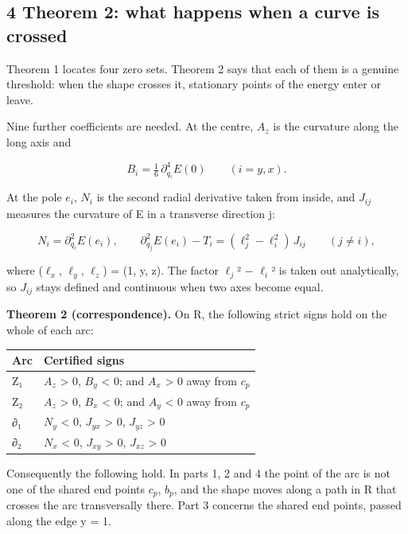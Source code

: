 \documentclass[
  11pt,
]{article}
\begin{document}
\subsection{4 Theorem 2: what happens when a curve is crossed}

Theorem 1 locates four zero sets. Theorem 2 says that each of them is a
genuine threshold: when the shape crosses it, stationary points of the
energy enter or leave.

Nine further coefficients are needed. At the centre, \(A_{z}\) is the
curvature along the long axis and

\[
B_i=\tfrac16\,\partial_{q_i}^4E(0)\qquad(i=y,x).
\]

At the pole \(e_{i}\), \(N_{i}\) is the second radial derivative taken
from inside, and \(J_{ij}\) measures the curvature of E in a transverse
direction j:

\[
N_i=\partial_{q_i}^2E(e_i),\qquad \partial_{q_j}^2E(e_i)-T_i=(\ell_j^2-\ell_i^2)\,J_{ij}\qquad(j\ne i),
\]

where (\(\ell_{x}\), \(\ell_{y}\), \(\ell_{z}\)) = (1, y, z). The factor
\(\ell_{j}\)² − \(\ell_{i}\)² is taken out analytically, so \(J_{ij}\)
stays defined and continuous when two axes become equal.

\textbf{Theorem 2 (correspondence).} On R, the following strict signs
hold on the whole of each arc:

\begin{longtable}[]{@{}ll@{}}
\toprule\noalign{}
Arc & Certified signs \\
\midrule\noalign{}
\endhead
\bottomrule\noalign{}
\endlastfoot
Z₁ & \(A_{z}\) \textgreater{} 0, \(B_{y}\) \textless{} 0; and \(A_{x}\)
\textgreater{} 0 away from \(c_{p}\) \\
Z₂ & \(A_{z}\) \textgreater{} 0, \(B_{x}\) \textless{} 0; and \(A_{y}\)
\textless{} 0 away from \(c_{p}\) \\
∂₁ & \(N_{y}\) \textless{} 0, \(J_{yx}\) \textgreater{} 0, \(J_{yz}\)
\textgreater{} 0 \\
∂₂ & \(N_{x}\) \textless{} 0, \(J_{xy}\) \textgreater{} 0, \(J_{xz}\)
\textgreater{} 0 \\
\end{longtable}

Consequently the following hold. In parts 1, 2 and 4 the point of the
arc is not one of the shared end points \(c_{p}\), \(b_{p}\), and the
shape moves along a path in R that crosses the arc transversally there.
Part 3 concerns the shared end points, passed along the edge y = 1.
\end{document}
